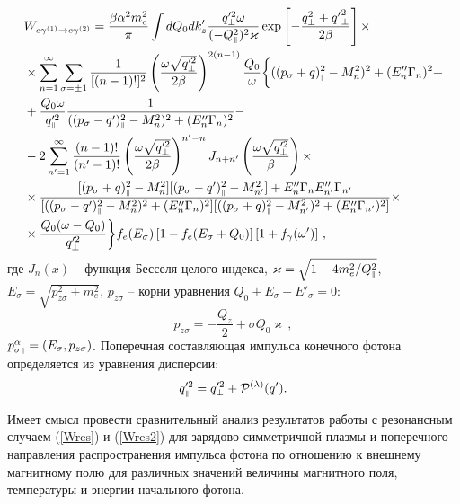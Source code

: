 \begin{equation}
	\begin{aligned}\label{Wres2}
		&W_{e\gamma^{(1)}\to e\gamma^{(2)}}=\frac{\beta\alpha^2m_e^2}{\pi} \int 
		dQ_0dk'_z \frac{q_\perp'^2\omega } 
		{(-Q_{\mbox{\tiny $\|$}}^2)^2\varkappa}\exp\left[-\frac{q_\perp^2+{q'}_\perp^2}{2\beta}\right]
		\times
		\\
		&\times\sum_{n=1}^{\infty}\sum_{\sigma=\pm 
		1}\frac{1}{[(n-1)!]^2}\left(\frac{\omega 
		\sqrt{q_\perp'^2}}{2\beta}\right)^{2(n-1)}\frac{Q_0}{\omega}\bigg\{
		{((p_\sigma+q)_{\mbox{\tiny $\|$}}^2-M_n^2)^2+(E''_n\Gamma_n)^2}+
		\\
		&+\frac{Q_0 \omega}{ q'^2_{\mbox{\tiny $\|$}}}\frac{1}{((p_\sigma-q')_{\mbox{\tiny $\|$}}^2-M_n^2)^2+(E''_n\Gamma_n)^2}-
		\\
		&-2
		\sum_{n'=1}^{\infty}\frac{(n-1)!}{(n'-1)!}\left(\frac{\omega \sqrt{q_\perp'^2}}{2\beta}\right)^{n'-n} J_{n+n'}\left(\frac{\omega \sqrt{q_\perp'^2}}{\beta}\right)\times\\
		&\times\frac{[(p_\sigma+q)^2_{\mbox{\tiny $\|$}}-M_n^2][(p_\sigma-q')^2_{\mbox{\tiny $\|$}}-M^2_{n'}]+E''_n\Gamma_nE''_{n'}\Gamma_{n'}}{[((p_\sigma-q')_{\mbox{\tiny $\|$}}^2-M_n^2)^2+(E''_n\Gamma_n)^2][((p_\sigma+q)_{\mbox{\tiny $\|$}}^2-M_{n'}^2)^2+(E''_n\Gamma_{n'})^2]}
		\times\\&\times
		\frac{Q_0(\omega-Q_0)}{q'^2_\perp}
		\bigg\}f_e{(E_\sigma)}\left[1-f_e{(E_\sigma+Q_0)}\right]\left[1+f_\gamma(\omega')\right]
		 \, ,
	\end{aligned}
\end{equation}
\noindent где $J_n(x)$ -- функция Бесселя целого индекса, 
\mbox{$\varkappa = \sqrt{1 - 4m_e^2/Q^2_{\mbox{\tiny $\|$}}}$, 
	$E_\sigma=\sqrt{p_{z\sigma}^2+m_e^2}$}, $p_{z\sigma}$ -- корни уравнения 
$Q_0+E_\sigma-E'_\sigma=0$:
\begin{equation}\label{savelaw}
	p_{z\sigma}=-\frac{Q_z}{2}+ \sigma Q_0 \varkappa\, ,
\end{equation}
$p^\alpha_{\sigma\mbox{\tiny $\|$}}=(E_\sigma,p_{z\sigma})$. 
Поперечная составляющая импульса конечного фотона определяется из уравнения 
дисперсии:
\begin{equation}
	q'^2_{\mbox{\tiny $\|$}}=q'^{2}_\perp + {\cal P}^{(\lambda)}(q') .
\end{equation}

Имеет смысл провести сравнительный анализ результатов работы \cite{Chistyakov:2009}  с резонансным случаем (\ref{Wres}) и (\ref{Wres2}) для зарядово-симметричной плазмы и поперечного направления распространения импульса фотона по отношению к внешнему магнитному полю для различных значений величины магнитного поля, температуры и энергии начального фотона.

